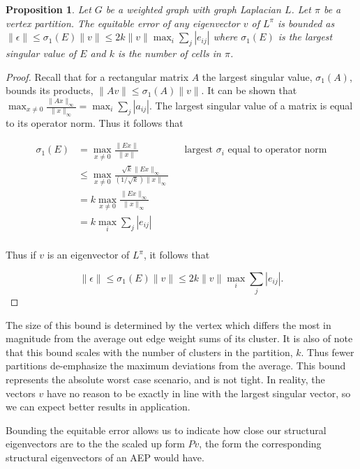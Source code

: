 \documentclass[%
 aip,
 amsmath,amssymb,
preprint,
reprint, onecolumn %
]{revtex4-1}
\newtheorem{prop}[theorem]{Proposition}
\begin{document}
\begin{prop}
    Let $G$ be a weighted graph with graph Laplacian $L$. Let $\pi$ be a vertex partition. The equitable error of any eigenvector $v$ of $L^\pi$ is bounded as $\|\epsilon\| \leq \sigma_1(E)\|v\|\leq 2k\|v\| \max_i  \sum_{j}\left|e_{ij}\right|$ where $\sigma_1(E)$ is the largest singular value of $E$ and $k$ is the number of cells in $\pi$.
\end{prop}

\begin{proof}
    Recall that for a rectangular matrix $A$ the largest singular value, $\sigma_1(A)$, bounds its products, $\|Av\|\leq \sigma_1(A) \|v\|$. It can be shown that $\max_{x\not=0}\frac{\|Ax\|_\infty}{\|x\|_\infty} = \max_i \sum_{j} |a_{ij}|$. The largest singular value of a matrix is equal to its operator norm. Thus it follows that 
    
    \begin{align*}
        \sigma_1(E)&= \max_{x\not=0}\frac{\|Ex\|}{\|x\|}      &&\text{largest $\sigma_i$ equal to operator norm}\\
        &\leq \max_{x\not=0}\frac{\sqrt{k}\|Ex\|_\infty}{(1/\sqrt{k})\|x\|_\infty}\\
        &= k \max_{x\not=0}\frac{\|Ex\|_\infty}{\|x\|_\infty}\\
        &=k \max_i \sum_{j} |e_{ij}|\\
    \end{align*}
    
    Thus if $v$ is an eigenvector of $L^\pi$, it follows that
    
    \[
    \|\epsilon\| \leq \sigma_1(E)\|v\|\leq 2k\|v\| \max_i  \sum_{j}\left|e_{ij}\right|.
    \]
\end{proof}

The size of this bound is determined by the vertex which differs the most in magnitude from the average out edge weight sums of its cluster. It is also of note that this bound scales with the number of clusters in the partition, $k$. Thus fewer partitions de-emphasize the maximum deviations from the average. This bound represents the absolute worst case scenario, and is not tight. In reality, the vectors $v$ have no reason to be exactly in line with the largest singular vector, so we can expect better results in application.

Bounding the equitable error allows us to indicate how close our structural eigenvectors are to the the scaled up form $Pv$, the form the corresponding structural eigenvectors of an AEP would have.
\end{document}
